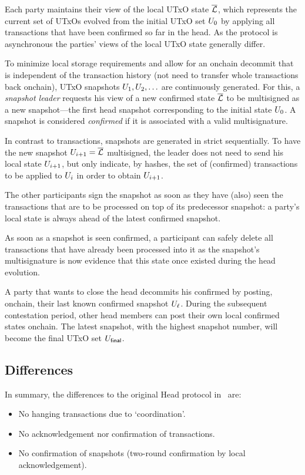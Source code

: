 Each party maintains their view of the local UTxO state $\overline {\mathcal L}$, which
represents the current set of UTxOs evolved from the initial UTxO set $U_{0}$
by applying all transactions that  have been confirmed so far in the head. As the
protocol is asynchronous the parties' views of the local UTxO state generally
differ.

 To minimize local storage requirements and allow for an
onchain decommit that is independent of the transaction history (not need to
transfer whole transactions back onchain), UTxO snapshots $U_1,U_2,\ldots$ are
continuously generated. For this, a \emph{snapshot leader} requests his view of
a new confirmed state $\overline {\mathcal L}$ to be multisigned as a new snapshot---the first
head snapshot corresponding to the initial state $U_{0}$. A snapshot is
considered \emph{confirmed} if it is associated with a valid multisignature.

In contrast to transactions, snapshots are generated in strict sequentially. To
have the new snapshot $U_{i+1}=\overline {\mathcal L}$ multisigned, the leader does not need
to send his local state $U_{i+1}$, but only indicate, by hashes, the set of
(confirmed) transactions to be applied to $U_i$ in order to obtain
$U_{i+1}$.

The other participants sign the snapshot as soon as they have (also) seen the
transactions that are to be processed on top of its predecessor snapshot: a
party's local state is always ahead of the latest confirmed snapshot.

As soon as a snapshot is seen confirmed, a participant can safely
delete all transactions that have already been processed into it as the
snapshot's multisignature is now evidence that this state once existed
during the head evolution.

 A party that wants to close the head decommits
his confirmed by posting, onchain, their last known confirmed snapshot
$U_\ell$. During the subsequent contestation period, other head members can
post their own local confirmed states onchain. The latest snapshot, with the
highest snapshot number, will become the final UTxO set $U_{\mathsf{final}}$.

\subsection{Differences}

In summary, the differences to the original Head protocol in~\cite{hydrahead20} are:

\begin{itemize}
  \item No hanging transactions due to `coordination'.
  \item No acknowledgement nor confirmation of transactions.
  \item No confirmation of snapshots (two-round confirmation by local acknowledgement).
\end{itemize}


